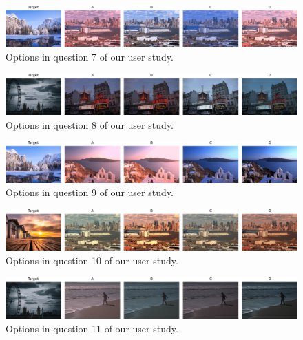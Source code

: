 \begin{figure}[ht]
    \centering
    \includegraphics[width=1\linewidth]{figures/user_study/question_7.png}
    \caption{Options in question 7 of our user study.}
    \label{fig:appendix-user-study-q7}
\end{figure}



\begin{figure}[ht]
    \centering
    \includegraphics[width=1\linewidth]{figures/user_study/question_8.png}
    \caption{Options in question 8 of our user study.}
    \label{fig:appendix-user-study-q8}
\end{figure}



\begin{figure}[ht]
    \centering
    \includegraphics[width=1\linewidth]{figures/user_study/question_9.png}
    \caption{Options in question 9 of our user study.}
    \label{fig:appendix-user-study-q9}
\end{figure}



\begin{figure}[ht]
    \centering
    \includegraphics[width=1\linewidth]{figures/user_study/question_10.png}
    \caption{Options in question 10 of our user study.}
    \label{fig:appendix-user-study-q10}
\end{figure}



\begin{figure}[ht]
    \centering
    \includegraphics[width=1\linewidth]{figures/user_study/question_11.png}
    \caption{Options in question 11 of our user study.}
    \label{fig:appendix-user-study-q11}
\end{figure}



